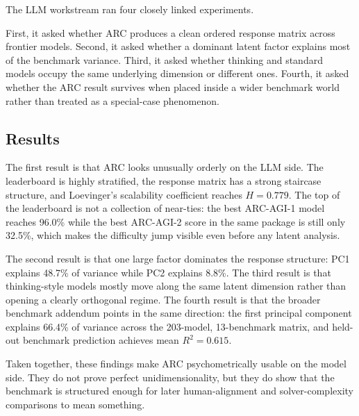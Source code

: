 The LLM workstream ran four closely linked experiments.

First, it asked whether ARC produces a clean ordered response matrix across frontier models. Second, it asked whether a dominant latent factor explains most of the benchmark variance. Third, it asked whether thinking and standard models occupy the same underlying dimension or different ones. Fourth, it asked whether the ARC result survives when placed inside a wider benchmark world rather than treated as a special-case phenomenon.

\subsection{Results}

The first result is that ARC looks unusually orderly on the LLM side. The leaderboard is highly stratified, the response matrix has a strong staircase structure, and Loevinger's scalability coefficient reaches $H = 0.779$. The top of the leaderboard is not a collection of near-ties: the best ARC-AGI-1 model reaches 96.0\% while the best ARC-AGI-2 score in the same package is still only 32.5\%, which makes the difficulty jump visible even before any latent analysis.

The second result is that one large factor dominates the response structure: PC1 explains 48.7\% of variance while PC2 explains 8.8\%. The third result is that thinking-style models mostly move along the same latent dimension rather than opening a clearly orthogonal regime. The fourth result is that the broader benchmark addendum points in the same direction: the first principal component explains 66.4\% of variance across the 203-model, 13-benchmark matrix, and held-out benchmark prediction achieves mean $R^2 = 0.615$.

Taken together, these findings make ARC psychometrically usable on the model side. They do not prove perfect unidimensionality, but they do show that the benchmark is structured enough for later human-alignment and solver-complexity comparisons to mean something.

